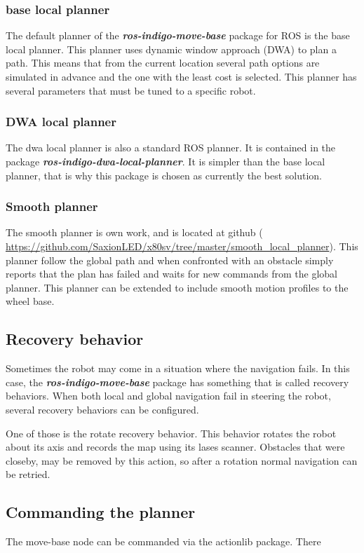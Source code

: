 \documentclass[a4paper]{article}
\newcommand{\rospackage}[1]{\textbf{\textit{ros-indigo-#1}}}
\begin{document}
\subsubsection{base local planner}
The default planner of the \rospackage{move-base} package for ROS is the base local planner.
This planner uses dynamic window approach (DWA) to plan a path. This means that from the current 
location several path options are simulated in advance and the one with the least cost is selected.
This planner has several parameters that must be tuned to a specific robot.

\subsubsection{DWA local planner}
The dwa local planner is also a standard ROS planner. It is contained in the package
\rospackage{dwa-local-planner}.
It is simpler than the base local planner,
that is why this package is chosen as currently the best solution.

\subsubsection{Smooth planner}
The smooth planner is own work, and is located at github (
\url{https://github.com/SaxionLED/x80sv/tree/master/smooth_local_planner}).
This planner follow the global path and when confronted with an obstacle simply
reports that the plan has failed and waits for new commands from the global planner.
This planner can be extended to include smooth motion profiles to the wheel base.

\subsection{Recovery behavior}
Sometimes the robot may come in a situation where the navigation fails. In this case, the 
\rospackage{move-base} package
has something that is called recovery behaviors. When both local and global navigation fail in
steering the robot, several recovery behaviors can be configured.

One of those is the rotate
recovery behavior. This behavior rotates the robot about its axis and records the map using its lases
scanner. Obstacles that were closeby, may be removed by this action, so after a rotation normal navigation
can be retried.

\subsection{Commanding the planner}
The move-base node can be commanded via the actionlib package. There
\end{document}
